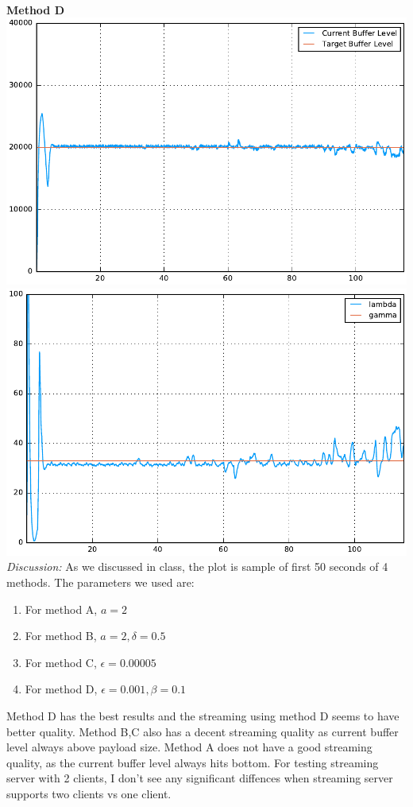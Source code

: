 \documentclass[12pt]{article}
\newenvironment{problem}[2][Problem]{\begin{trivlist}
\item[\hskip \labelsep {\bfseries #1}\hskip \labelsep {\bfseries #2.}]}{\end{trivlist}}
\begin{document}
\begin{problem}{1}
\\
\textbf{Method D}
\\
\includegraphics[scale = .5]{listen3.pdf}
\includegraphics[scale = .5]{stream3.pdf}
\\
\textit{Discussion:}
As we discussed in class, the plot is sample of first 50 seconds of 4 methods. The parameters we used are:
\begin{enumerate}
	\item For method A, $a = 2$
	\item For method B, $a = 2, \delta = 0.5$
	\item For method C, $\epsilon = 0.00005$
	\item For method D, $\epsilon = 0.001, \beta = 0.1$
\end{enumerate}
Method D has the best results and the streaming using method D seems to have better quality. Method B,C also has a decent streaming quality as current buffer level always above payload size. Method A does not have a good streaming quality, as the current buffer level always hits bottom. For testing streaming server with 2 clients, I don't see any significant diffences when streaming server supports two clients vs one client.
\end{problem}
\end{document}
